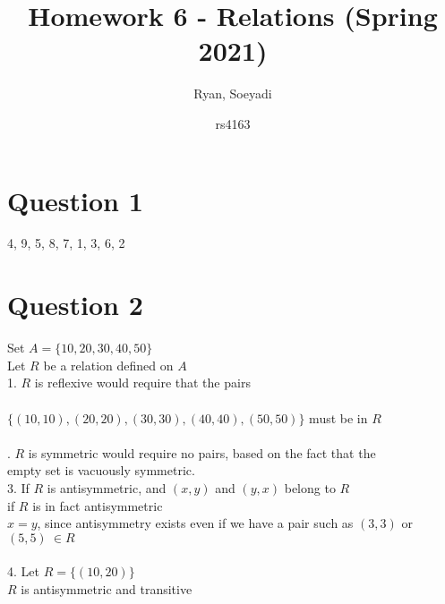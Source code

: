 \documentclass{article}
\title{Homework 6 - Relations (Spring 2021)}
\author
{
Ryan, Soeyadi
\and rs4163
}
\begin{document}
    \maketitle
    
    \section*{Question 1}
    4, 9, 5, 8, 7, 1, 3, 6, 2
    \newpage
    \section*{Question 2}
    Set $A = \{10,20,30,40,50\}$ \\Let $R$ be a relation defined on $A$ \\  
    
    1. $R$ is reflexive would require that the pairs \\ \\
    \indent \indent$\{(10,10), (20,20), (30,30), (40,40), (50,50)\}$ must be in $R$ \\ \\
     . $R$ is symmetric would require no pairs, based on the fact that the \\ \indent empty set is vacuously symmetric.  \\
  
    3. If $R$ is antisymmetric, and $(x,y)$ and $(y,x)$ belong to $R$\\
    \indent if $R$ is in fact antisymmetric \\
    \indent $x = y$, since antisymmetry exists even if we have a pair such as $(3,3)$ or \indent$(5,5)\ \in R$\\ \\
    4. Let $R = \{(10,20)\}$ \\
    \indent $R$ is antisymmetric and transitive
    
    \newpage
\end{document}
